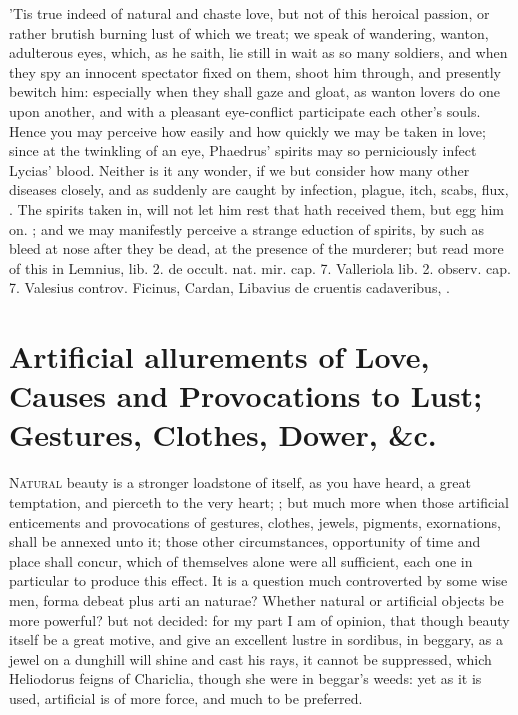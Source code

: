 {'Tis true indeed of natural and chaste love, but not of this heroical
passion, or rather brutish burning lust of which we treat; we speak of
wandering, wanton, adulterous eyes, which, as he saith, lie still
in wait as so many soldiers, and when they spy an innocent spectator
fixed on them, shoot him through, and presently bewitch him: especially
when they shall gaze and gloat, as wanton lovers do one upon another,
and with a pleasant eye-conflict participate each other's souls. Hence
you may perceive how easily and how quickly we may be taken in love;
since at the twinkling of an eye, Phaedrus' spirits may so perniciously
infect Lycias' blood. Neither is it any wonder, if we but
consider how many other diseases closely, and as suddenly are caught by
infection, plague, itch, scabs, flux, \etc{}. The spirits taken in, will
not let him rest that hath received them, but egg him on. ; and we may manifestly perceive
a strange eduction of spirits, by such as bleed at nose after they be
dead, at the presence of the murderer; but read more of this in
Lemnius, lib. 2. de occult. nat. mir. cap. 7. Valleriola lib. 2.
observ. cap. 7. Valesius controv. Ficinus, Cardan, Libavius de cruentis
cadaveribus, \etc{}.

\section[Artificial allures of Love]{Artificial allurements of Love, Causes and Provocations to Lust; Gestures, Clothes, Dower, \&c.}

\lettrine{N}{atural} beauty is a stronger loadstone of itself, as you have heard, a
great temptation, and pierceth to the very heart; ; but much more when those
artificial enticements and provocations of gestures, clothes, jewels,
pigments, exornations, shall be annexed unto it; those other
circumstances, opportunity of time and place shall concur, which of
themselves alone were all sufficient, each one in particular to produce
this effect. It is a question much controverted by some wise men, forma
debeat plus arti an naturae? Whether natural or artificial objects be
more powerful? but not decided: for my part I am of opinion, that
though beauty itself be a great motive, and give an excellent lustre in
sordibus, in beggary, as a jewel on a dunghill will shine and cast his
rays, it cannot be suppressed, which Heliodorus feigns of Chariclia,
though she were in beggar's weeds: yet as it is used, artificial is of
more force, and much to be preferred.

}
